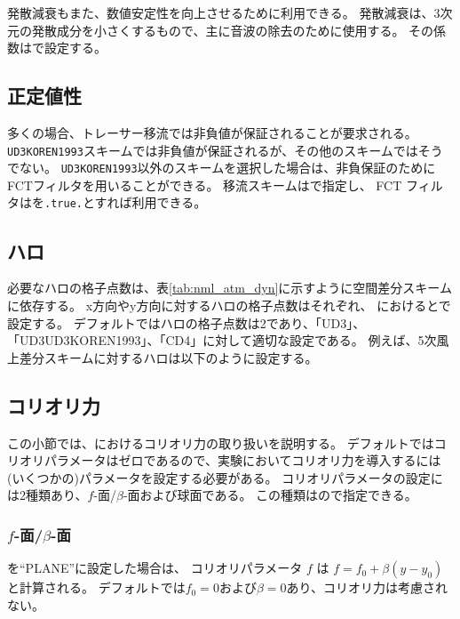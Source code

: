 発散減衰もまた、数値安定性を向上させるために利用できる。
発散減衰は、3次元の発散成分を小さくするもので、主に音波の除去のために使用する。
その係数はで設定する。

\subsection{正定値性}

多くの場合、トレーサー移流では非負値が保証されることが要求される。
\verb|UD3KOREN1993|スキームでは非負値が保証されるが、その他のスキームではそうでない。
\verb|UD3KOREN1993|以外のスキームを選択した場合は、非負保証のためにFCTフィルタを用いることができる。
移流スキームはで指定し、
FCT フィルタはを\verb|.true.|とすれば利用できる。

\subsection{ハロ}

必要なハロの格子点数は、表\ref{tab:nml_atm_dyn}に示すように空間差分スキームに依存する。
x方向やy方向に対するハロの格子点数はそれぞれ、
におけるとで設定する。
デフォルトではハロの格子点数は2であり、「UD3」、「UD3UD3KOREN1993」、「CD4」に対して適切な設定である。
例えば、5次風上差分スキームに対するハロは以下のように設定する。


\subsection{コリオリ力} \label{subsec:coriolis}

この小節では、{\scalerm}におけるコリオリ力の取り扱いを説明する。
デフォルトではコリオリパラメータはゼロであるので、実験においてコリオリ力を導入するには
(いくつかの)パラメータを設定する必要がある。
コリオリパラメータの設定には2種類あり、$f$-面/$\beta$-面および球面である。
この種類はので指定できる。

\subsubsection{$f$-面/$\beta$-面}
を``PLANE''に設定した場合は、
コリオリパラメータ $f$ は $f=f_0 + \beta (y-y_0)$と計算される。
デフォルトでは$f_0=0$および$\beta=0$あり、コリオリ力は考慮されない。

